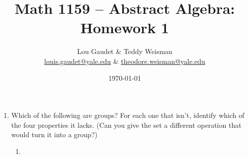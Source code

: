 \documentclass[10pt, letterpaper]{article}
\theoremstyle{definition}
\theoremstyle{plain}
\theoremstyle{remark}
\begin{document}
\title{Math 1159 -- Abstract Algebra: Homework 1}
\author{Lou Gaudet \& Teddy Weisman \\ \url{louis.gaudet@yale.edu} \& \url{theodore.weisman@yale.edu}}
\date{\today}
\maketitle

\begin{enumerate}

\item Which of the following are groups? For each one that isn't, identify which of the four properties it lacks. (Can you give the set a different operation that would turn it into a group?)
\begin{enumerate}
\item
\end{enumerate}

\end{enumerate}
\end{document}
